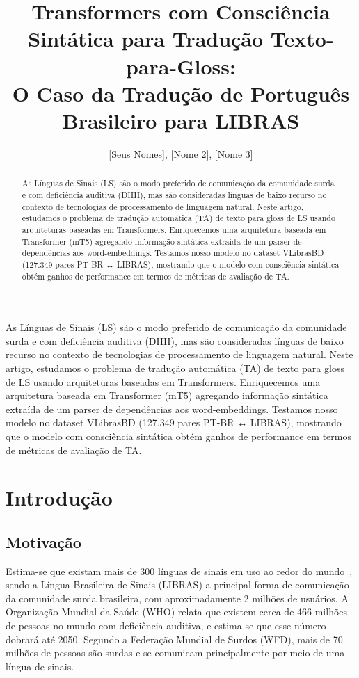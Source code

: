 \documentclass[12pt]{article}
\title{Transformers com Consciência Sintática para Tradução Texto-para-Gloss:\\
O Caso da Tradução de Português Brasileiro para LIBRAS}
\author{[Seus Nomes]\inst{1}, [Nome 2]\inst{2}, [Nome 3]\inst{1}}
\begin{document}
 

\maketitle

\begin{abstract}
As Línguas de Sinais (LS) são o modo preferido de comunicação da comunidade surda e com deficiência auditiva (DHH), mas são consideradas línguas de baixo recurso no contexto de tecnologias de processamento de linguagem natural. Neste artigo, estudamos o problema de tradução automática (TA) de texto para gloss de LS usando arquiteturas baseadas em Transformers. Enriquecemos uma arquitetura baseada em Transformer (mT5) agregando informação sintática extraída de um parser de dependências aos word-embeddings. Testamos nosso modelo no dataset VLibrasBD (127.349 pares PT-BR ↔ LIBRAS), mostrando que o modelo com consciência sintática obtém ganhos de performance em termos de métricas de avaliação de TA.
\end{abstract}
     
\begin{resumo} 
As Línguas de Sinais (LS) são o modo preferido de comunicação da comunidade surda e com deficiência auditiva (DHH), mas são consideradas línguas de baixo recurso no contexto de tecnologias de processamento de linguagem natural. Neste artigo, estudamos o problema de tradução automática (TA) de texto para gloss de LS usando arquiteturas baseadas em Transformers. Enriquecemos uma arquitetura baseada em Transformer (mT5) agregando informação sintática extraída de um parser de dependências aos word-embeddings. Testamos nosso modelo no dataset VLibrasBD (127.349 pares PT-BR ↔ LIBRAS), mostrando que o modelo com consciência sintática obtém ganhos de performance em termos de métricas de avaliação de TA.
\end{resumo}

\section{Introdução}

\subsection{Motivação}

Estima-se que existam mais de 300 línguas de sinais em uso ao redor do mundo~\cite{ethnologue2021}, sendo a Língua Brasileira de Sinais (LIBRAS) a principal forma de comunicação da comunidade surda brasileira, com aproximadamente 2 milhões de usuários. A Organização Mundial da Saúde (WHO) relata que existem cerca de 466 milhões de pessoas no mundo com deficiência auditiva, e estima-se que esse número dobrará até 2050. Segundo a Federação Mundial de Surdos (WFD), mais de 70 milhões de pessoas são surdas e se comunicam principalmente por meio de uma língua de sinais.
\end{document}
